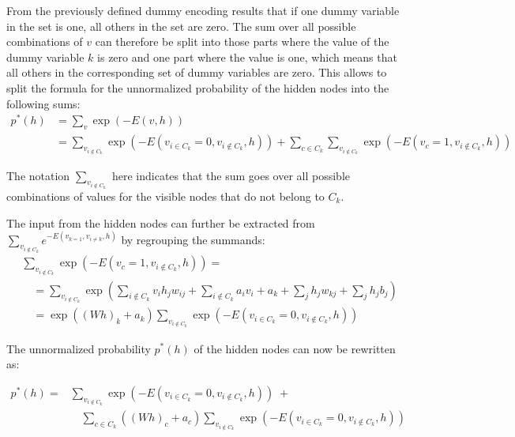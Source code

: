 \documentclass[12pt]{article}
\begin{document}
From the previously defined dummy encoding results that if one dummy variable in the set is one, all others in the set are zero.
The sum over all possible combinations of $v$ can therefore be split into those parts where the value of the dummy variable $k$ is zero and one part where the value is one, which means that all others in the corresponding set of dummy variables are zero.
This allows to split the formula for the unnormalized probability of the hidden nodes into the following sums:
\begin{align}
p^*(h) &= \sum_v  \exp (-E(v,h)) \nonumber \\
&= \sum_{v_{i \notin C_k}} \exp (-E(v_{i \in C_k} = 0, v_{i \notin C_k}, h)) + \sum_{c \in C_k} \sum_{v_{i \notin C_k}} \exp ( - E(v_c = 1, v_{i \notin C_k},  h))
\end{align}

The notation $\sum_{v_{i \notin C_k}}$ here indicates that the sum goes over all possible combinations of values for the visible nodes that do not belong to $C_k$.

The input from the hidden nodes can further be extracted from $ \sum_{v_{i \notin C_k}} e^{-E(v_{k=1}, v_{i \neq k}, h)}$ by regrouping the summands:
\begin{align}
&\sum_{v_{i \notin C_k}} \exp ( - E(v_c = 1, v_{i \notin C_k},  h)) = \nonumber \\
&\quad = \sum_{v_{i \notin C_k}} \exp \left( \sum_{i \notin C_k} v_i h_j w_{ij} + \sum_{i \notin C_k} a_i v_i + a_k  + \sum_j h_j w_{kj} +\sum_j h_j b_j \right) \nonumber \\
&\quad = \exp \left( (Wh)_k + a_k \right) \sum_{v_{i \notin C_k}} \exp \left(-E(v_{i \in C_k} = 0, v_{i \notin C_k}, h) \right)
\label{eqn:sumvksoftmax}
\end{align}

The unnormalized probability $p^*(h)$ of the hidden nodes can now be rewritten as:

\begin{align}
p^*(h) =& \sum_{v_{i \notin C_k}} \exp (-E(v_{i \in C_k} = 0, v_{i \notin C_k}, h)) \; + \nonumber \\
&\quad  \sum_{c \in C_k} \left( (Wh)_c + a_c \right) \sum_{v_{i \notin C_k}} \exp \left(-E(v_{i \in C_k} = 0, v_{i \notin C_k}, h) \right)
\label{eqn:unnormalizedhiddensplit}
\end{align}
\end{document}
